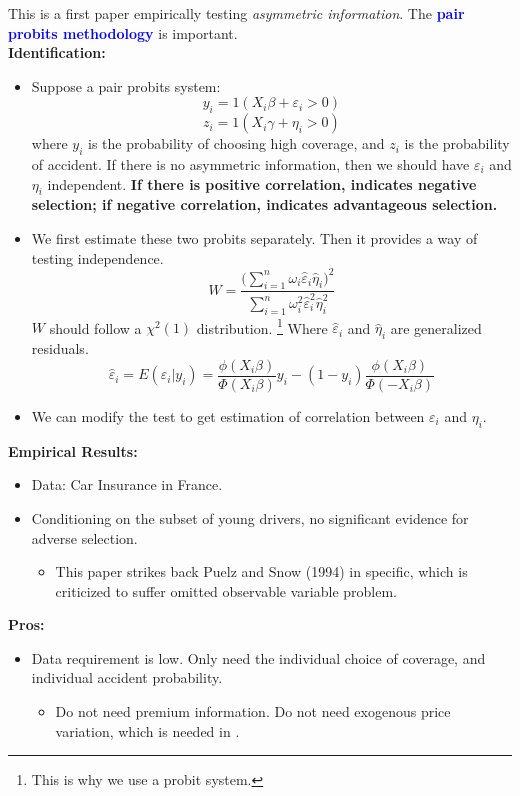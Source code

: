\documentclass{book}
\theoremstyle{plain}
\theoremstyle{definition}
\begin{document}
\textbf{}

This is a first paper empirically testing \textit{asymmetric information}. The \textbf{\textcolor{blue}{pair probits methodology}} is important.\\

\noindent
\textbf{Identification:}
\begin{itemize}
	\item Suppose a pair probits system:
	\[y_i = 1(X_i \beta +\varepsilon_i>0)\]
	\[z_i = 1(X_i\gamma+ \eta_i>0)\]
	where $y_i$ is the probability of choosing high coverage, and $z_i$ is the probability of accident.
	If there is no asymmetric information, then we should have $\varepsilon_i$ and $\eta_i$ independent.
	\textbf{
	If there is positive correlation, indicates negative selection; if negative correlation, indicates advantageous selection.
	}

	\item We first estimate these two probits separately. Then it provides a way of testing independence.
	\[W = \frac{\Big(\sum_{i=1}^n{\omega_i\hat \varepsilon_i \hat \eta_i}\Big)^2}
	{\sum_{i=1}^n{\omega_i^2 \hat \varepsilon_i^2 \hat \eta_i^2}}\]
	$W$ should follow a $\chi^2(1)$ distribution.
	\footnote{This is why we use a probit system.} 
	Where $\hat \varepsilon_i$ and $\hat \eta_i$ are generalized residuals.
	\[\hat \varepsilon_i=
	E(\varepsilon_i|y_i)=
	\frac{\phi(X_i\beta)}{\Phi(X_i\beta)}y_i
	-(1-y_i)\frac{\phi(X_i\beta)}{\Phi(-X_i\beta)}\]

	\item We can modify the test to get estimation of correlation between $\varepsilon_i$ and $\eta_i$.
\end{itemize}

\vspace{1em}
\noindent
\textbf{Empirical Results:}
\begin{itemize}
	\item Data: Car Insurance in France.
	\item Conditioning on the subset of young drivers, no significant evidence for adverse selection.
	\begin{itemize}
		\item This paper strikes back Puelz and Snow (1994) in specific, which is criticized to suffer omitted observable variable problem.
	\end{itemize}
\end{itemize}

\vspace{1em}
\noindent
\textbf{Pros:}
\begin{itemize}
	\item Data requirement is low. Only need the individual choice of coverage, and individual accident probability.
	\begin{itemize}
		\item Do not need premium information. Do not need exogenous price variation, which is needed in \cite*{Einav:2010hb}.
	\end{itemize}
\end{itemize}
\end{document}
